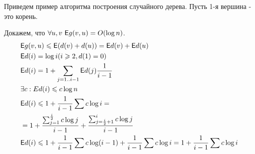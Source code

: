 \begin{example}
    Приведем пример алгоритма построения случайного дерева. Пусть 1-я вершина - это корень. \par

  \begin{algorithm}
    \begin{algorithmic}
        \EndIf
      \EndFor
    \end{algorithmic}
  \end{algorithm}

    Докажем, что $\forall u,v \ \mathsf{E} g(v,u)=O(\log n)$.
    \begin{align*}
        & \mathsf{E} g(v,u) \leqslant \mathsf{E}(d(v) + d(u)) = \mathsf{E} d(v) + \mathsf{E} d(u) \\
        & \mathsf{E} d(i)=\log i (i \geqslant{2},d(1)=0) \\
        & \mathsf{E} d(i)=1+\sum_{j=1..i-1} \mathsf{E} d(j) \frac{1}{i-1} \\
        & \exists c: Ed(i) \leqslant{c \log n} \\
        & \mathsf{E} d(i) \leqslant{ 1+ \frac{1}{i-1} \sum c \log i} = \\
        & = 1 + \frac{\sum_{j=1}^{\frac{i}{2}} c \log j}{i-1} + \frac{\sum_{j=\frac{i}{2}+1}^{i} c \log j}{i-1} \\
        & \mathsf{E} d(i) \leqslant{1+\frac{1}{i-1} \sum c\log (i-1) + \frac{1}{i-1} \sum c\log i} = 1 + \frac{1}{i-1} \sum c\log i
    \end{align*}
\end{example}